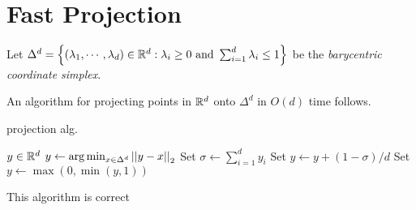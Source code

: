 \documentclass[eikonal.tex]{subfiles}
\begin{document}
\section{Fast Projection}

\begin{defn}
  Let
  $\Delta^d = \left\{(\lambda_1, \cdots, \lambda_d) \in \mathbb{R}^d :
    \lambda_i \geq 0 \mbox{ and } \sum_{i=1}^d \lambda_i \leq 1\right\}$ be
  the \emph{barycentric coordinate simplex}.
\end{defn}

An algorithm for projecting points in $\mathbb{R}^d$ onto $\Delta^d$ in $O(d)$
time follows.

\begin{algorithm}
  \caption{projection alg.}
  \begin{algorithmic}
    \REQUIRE $y \in \mathbb{R}^d$
    \ENSURE $y \gets \arg\min_{x \in \Delta^d} \left|\left|y - x\right|\right|_2$
    \STATE Set $\sigma \gets \sum_{i=1}^d y_i$
      \STATE Set $y \gets y + (1 - \sigma)/d$
    \ENDIF
    \STATE Set $y \gets \max(0, \min(y, 1))$
  \end{algorithmic}
\end{algorithm}

\begin{lemma}
  This algorithm is correct
\end{lemma}
\end{document}
